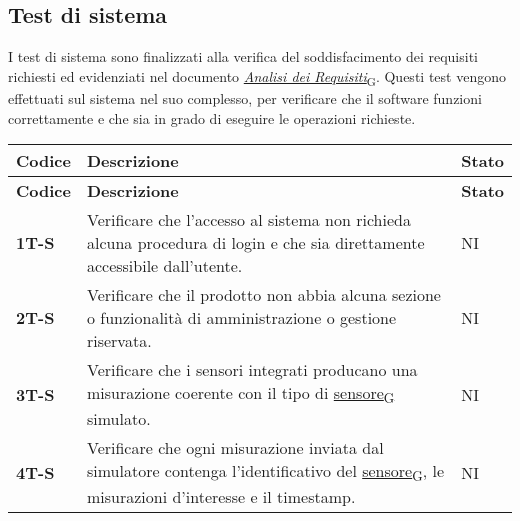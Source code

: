 \subsection{Test di sistema}
I test di sistema sono finalizzati alla verifica del soddisfacimento dei requisiti richiesti ed evidenziati nel documento \href{https://7last.github.io/docs/rtb/documentazione-esterna/analisi-dei-requisiti}{\href{https://7last.github.io/docs/pb/documentazione-interna/glossario\#analisi-dei-requisiti}{\textit{Analisi dei Requisiti}\textsubscript{G}}}. Questi test vengono effettuati sul sistema nel suo complesso, per verificare che il software funzioni correttamente e che sia in grado di eseguire le operazioni richieste. \\
\begin{longtable}{|>{\raggedright\arraybackslash}m{}|>{\raggedright\arraybackslash}m{}|>{\raggedright\arraybackslash}m{}|}
	\hline
	\textbf{Codice} & \textbf{Descrizione}                                                                                                                                                                             & \textbf{Stato} \\
	\hline
	\endfirsthead
	\hline
	\textbf{Codice} & \textbf{Descrizione}                                                                                                                                                                             & \textbf{Stato} \\
	\endhead
	\textbf{1T-S}   & Verificare che l'accesso al sistema non richieda alcuna procedura di login e che sia direttamente accessibile dall'utente.                                                                       & NI             \\
	\hline
	\textbf{2T-S}   & Verificare che il prodotto non abbia alcuna sezione o funzionalità di amministrazione o gestione riservata.                                                                                      & NI             \\
	\hline
	\textbf{3T-S}   & Verificare che i sensori integrati producano una misurazione coerente con il tipo di \href{https://7last.github.io/docs/pb/documentazione-interna/glossario\#sensore}{sensore\textsubscript{G}} simulato.                                                                                           & NI             \\
	\hline
	\textbf{4T-S}   & Verificare che ogni misurazione inviata dal simulatore contenga l’identificativo del \href{https://7last.github.io/docs/pb/documentazione-interna/glossario\#sensore}{sensore\textsubscript{G}}, le misurazioni d'interesse e il timestamp.                                                         & NI             \\

\end{longtable}
